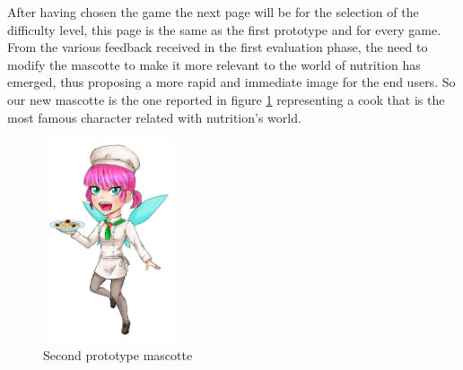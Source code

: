 After having chosen the game the next page will be for the selection of the difficulty level, this page is the same as the first prototype and for every game.\\
From the various feedback received in the first evaluation phase, the need to modify the mascotte to make it more relevant to the world of nutrition has emerged, thus proposing a more rapid and immediate image for the end users. So our new mascotte is the one reported in figure \ref{fig:newmascotte} representing a cook that is the most famous character related with nutrition's world.
\begin{figure}[H]
\centering
\includegraphics[width=4cm, height=6cm]{immagini/geamasc.png}
\caption{Second prototype mascotte}\label{fig:newmascotte}
\end{figure} 

